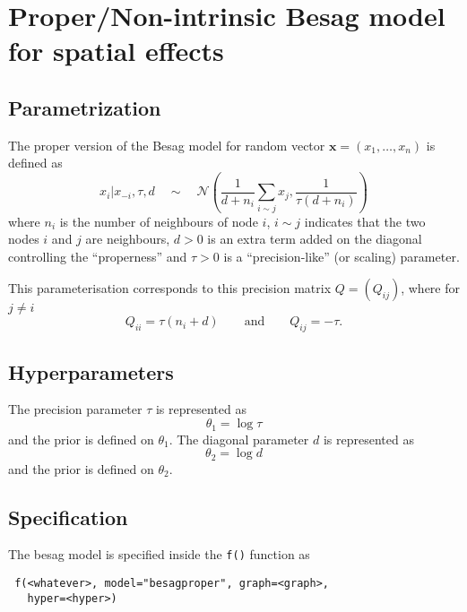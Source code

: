 \documentclass[a4paper,11pt]{article}
\begin{document}
\section*{Proper/Non-intrinsic Besag model for spatial effects}

\subsection*{Parametrization}

The proper version of the Besag model for random vector
$\mathbf{x}=(x_1,\dots,x_n)$ is defined as
\begin{equation}\label{eq.besag}
    x_i|x_{-i},\tau,d\quad\sim\quad \mathcal{N}\left(\frac{1}{d+
          n_i}\sum_{i\sim j}x_j,\frac{1}{\tau(d + n_i)}\right)
\end{equation}
where $n_i$ is the number of neighbours of node $i$, $i\sim j$
indicates that the two nodes $i$ and $j$ are neighbours, $d > 0$ is an
extra term added on the diagonal controlling the ``properness'' and
$\tau > 0$ is a ``precision-like'' (or scaling) parameter.

This parameterisation corresponds to this precision matrix ${Q} =
(Q_{ij})$, where for $j\not=i$
\begin{displaymath}
    Q_{ii} = \tau(n_{i} + d) \qquad\text{and}\qquad Q_{ij} = -\tau.
\end{displaymath}


\subsection*{Hyperparameters}

The precision parameter $\tau$ is represented as
\begin{displaymath}
    \theta_{1} =\log \tau
\end{displaymath}
and the prior is defined on $\theta_{1}$. The diagonal parameter $d$ is
represented as
\begin{displaymath}
    \theta_{2} =\log d
\end{displaymath}
and the prior is defined on $\theta_{2}$. 

\subsection*{Specification}

The besag model is specified inside the {\tt f()} function as
\begin{verbatim}
 f(<whatever>, model="besagproper", graph=<graph>,
   hyper=<hyper>)
\end{verbatim}
\end{document}
